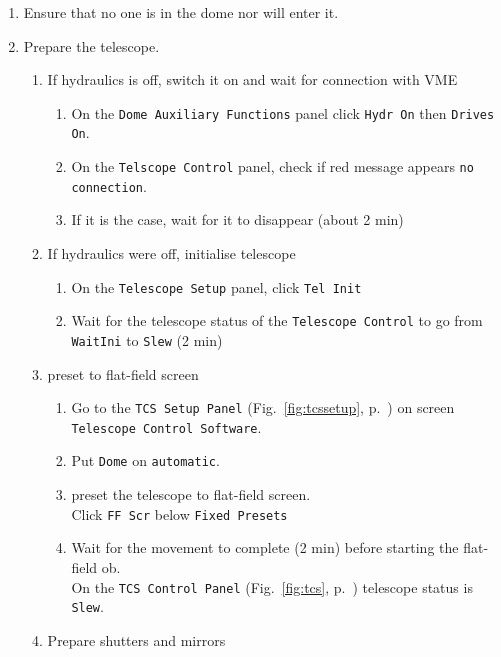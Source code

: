 \documentclass[11pt,fleqn]{book}
\def\figref#1{Fig.~\ref{fig:#1}, p.~\pageref{fig:#1}}
\begin{document}
   \begin{enumerate}
     \item Ensure that no one is in the dome nor will enter it.
     \item Prepare the telescope.
         \begin{enumerate}
            \item If hydraulics is off, switch it on and wait for connection with VME
                \begin{enumerate}
                    \item On the \texttt{Dome Auxiliary Functions} panel click \texttt{Hydr On} then \texttt{Drives On}.
                    \item On the \texttt{Telscope Control} panel, check if red message appears  \texttt{no connection}.
                    \item If it is the case, wait for it to disappear (about 2 min)
                \end{enumerate}
            \item If hydraulics were off, initialise telescope
                \begin{enumerate}
                    \item On the \texttt{Telescope Setup} panel, click \texttt{Tel Init}
                    \item Wait for the telescope status of  the \texttt{Telescope Control} to go from \texttt{WaitIni} to \texttt{Slew} (2 min)
                \end{enumerate}
            \item \Gls{preset} to flat-field screen
            \begin{enumerate}
                \item Go to the \texttt{TCS Setup Panel} (\figref{tcssetup}) on screen \texttt{Telescope Control Software}.
                \item Put \texttt{Dome} on \texttt{automatic}.
                \item \Gls{preset} the telescope to flat-field screen.\\
                  Click \texttt{FF Scr} below \texttt{Fixed Presets}
                \item Wait for the movement to complete (2 min) before starting the flat-field \gls{ob}.\\
                  On the \texttt{TCS Control Panel} (\figref{tcs}) telescope status is \texttt{Slew}.
            \end{enumerate}
            \item Prepare shutters and mirrors

\end{enumerate}
\end{enumerate}
\end{document}
